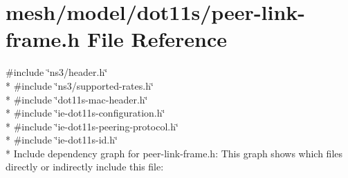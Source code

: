 \hypertarget{peer-link-frame_8h}{}\section{mesh/model/dot11s/peer-\/link-\/frame.h File Reference}
\label{peer-link-frame_8h}
{\ttfamily \#include \char`\"{}ns3/header.\+h\char`\"{}}\\*
{\ttfamily \#include \char`\"{}ns3/supported-\/rates.\+h\char`\"{}}\\*
{\ttfamily \#include \char`\"{}dot11s-\/mac-\/header.\+h\char`\"{}}\\*
{\ttfamily \#include \char`\"{}ie-\/dot11s-\/configuration.\+h\char`\"{}}\\*
{\ttfamily \#include \char`\"{}ie-\/dot11s-\/peering-\/protocol.\+h\char`\"{}}\\*
{\ttfamily \#include \char`\"{}ie-\/dot11s-\/id.\+h\char`\"{}}\\*
Include dependency graph for peer-\/link-\/frame.h\+:
This graph shows which files directly or indirectly include this file\+:
